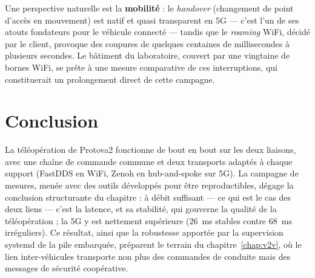 Une perspective naturelle est la \textbf{mobilité} : le \emph{handover}
(changement de point d'accès en mouvement) est natif et quasi transparent en
5G --- c'est l'un de ses atouts fondateurs pour le véhicule connecté ---
tandis que le \emph{roaming} WiFi, décidé par le client, provoque des coupures
de quelques centaines de millisecondes à plusieurs secondes. Le bâtiment du
laboratoire, couvert par une vingtaine de bornes WiFi, se prête à une mesure
comparative de ces interruptions, qui constituerait un prolongement direct de
cette campagne.

\section{Conclusion}

La téléopération de Protova2 fonctionne de bout en bout sur les deux liaisons,
avec une chaîne de commande commune et deux transports adaptés à chaque
support (FastDDS en WiFi, Zenoh en hub-and-spoke sur 5G). La campagne de
mesures, menée avec des outils développés pour être reproductibles, dégage la
conclusion structurante du chapitre : à débit suffisant --- ce qui est le cas
des deux liens --- c'est la latence, et sa stabilité, qui gouverne la qualité
de la téléopération ; la 5G y est nettement supérieure (26~ms stables contre
68~ms irréguliers). Ce résultat, ainsi que la robustesse apportée par la
supervision systemd de la pile embarquée, préparent le terrain du
chapitre~\ref{chap:v2v}, où le lien inter-véhicules transporte non plus des
commandes de conduite mais des messages de sécurité coopérative.
